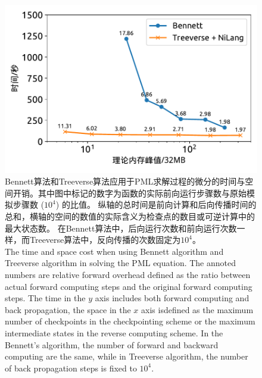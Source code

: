 \documentclass[A4,twoside,UTF8]{ctexart}
\begin{document}
\begin{figure}[t]
\centering
\includegraphics[width=0.6\columnwidth]{./fig5.pdf}
    \caption{Bennett算法和Treeverse算法应用于PML求解过程的微分的时间与空间开销。其中图中标记的数字为函数的实际前向运行步骤数与原始模拟步骤数 ($10^4$) 的比值。
    纵轴的总时间是前向计算和后向传播时间的总和，横轴的空间的数值的实际含义为检查点的数目或可逆计算中的最大状态数。
    在Bennett算法中，后向运行次数和前向运行次数一样，而Treeverse算法中，反向传播的次数固定为$10^4$。\\
    The time and space cost when using Bennett algorithm and Treeverse algorithm in solving the PML equation.
    The annoted numbers are relative forward overhead defined as the ratio between actual forward computing steps and the original forward computing steps.
    The time in the $y$ axis includes both forward computing and back propagation, the space in the $x$ axis isdefined as the maximum number of checkpoints in the checkpointing scheme or the maximum intermediate states in the reverse computing scheme.
    In the Bennett's algorithm, the number of forward and backward computing are the same, while in Treeverse algorithm, the number of back propagation steps is fixed to $10^4$.
    }
    \label{fig:seismic}
\end{figure}
\end{document}

